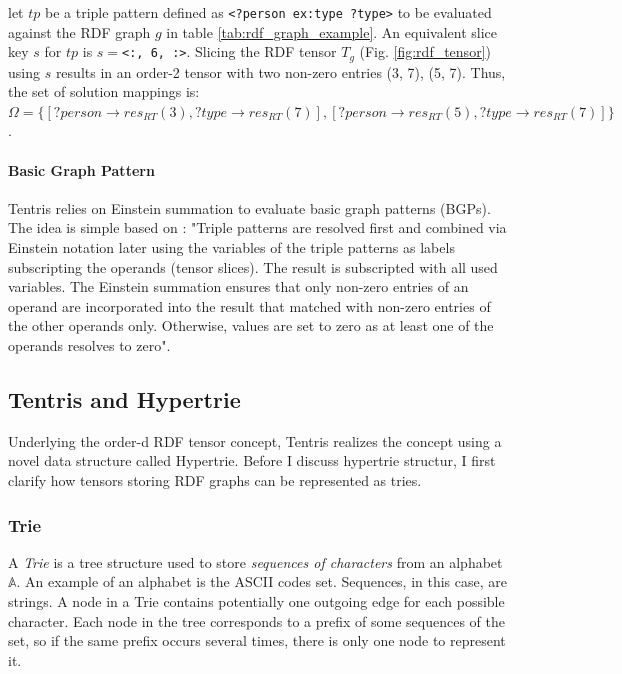 \begin{example}
	let $tp$ be a triple pattern defined as \verb|<?person ex:type ?type>| to be evaluated against the RDF graph $g$ in table \ref{tab:rdf_graph_example}.  An equivalent slice key $s$ for $tp$ is $s=$\verb|<:, 6, :>|. Slicing the RDF tensor $T_{g}$ (Fig. \ref{fig:rdf_tensor}) using $s$ results in an order-2 tensor with two non-zero entries (3, 7), (5, 7). Thus, the set of solution mappings is:\\ $\Omega = \{[?person \to res_{RT}(3), ?type \to res_{RT}(7)], [?person \to res_{RT}(5), ?type \to res_{RT}(7)]\}$.
\end{example}

\paragraph{Basic Graph Pattern}
Tentris relies on Einstein summation to evaluate basic graph patterns (BGPs). The idea is simple based on \cite{tentris2020}: "Triple patterns are resolved first and combined
via Einstein notation later using the variables of the triple patterns as labels subscripting
the operands (tensor slices). The result is subscripted with all used variables. The Einstein summation ensures that only non-zero entries of an operand are incorporated into
the result that matched with non-zero entries of the other operands only. Otherwise, values are set to zero as at least one of the operands resolves to zero".
\clearpage

\subsection{Tentris and Hypertrie}
\label{sec:hypertrie}
Underlying the order-d RDF tensor concept, Tentris realizes the concept using a novel data structure called Hypertrie. Before I discuss hypertrie structur, I first clarify how tensors storing RDF graphs can be represented as tries.\\

\subsubsection{Trie}
\label{sec:trie}
A \textit{Trie} \cite{Brass:2008:ADS:1434862} is a tree structure used to store \textit{sequences of characters} from an alphabet $\mathbb{A}$. An example of an alphabet is the ASCII codes set. Sequences, in this case, are strings. A node in a Trie contains potentially one outgoing edge for each possible character. Each node in the tree corresponds to a prefix of some sequences of the set, so if the same prefix occurs several times, there is only one node to represent it.\\

